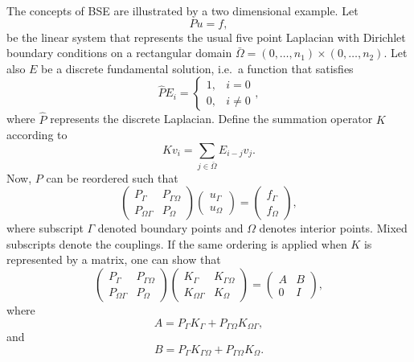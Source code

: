 \documentclass{report}
\begin{document}
The concepts of BSE are illustrated by a two dimensional example. Let
\[
Pu=f,
\]
be the linear system that represents the usual five point Laplacian
with Dirichlet boundary conditions on a rectangular domain
$\bar{\Omega}=(0,\ldots,n_1)\times(0,\ldots,n_2)$. Let also $E$ be a
discrete fundamental solution, i.e.~a function that satisfies
\[
\hat{P}E_i = \left\{ \begin{array}{ll}
1, & i=0\\
0, & i\ne 0 \end{array} \right. ,
\]
where $\hat{P}$ represents the discrete Laplacian. Define the
summation operator $K$ according to
\[
Kv_i = \sum_{j\in\bar{\Omega}}E_{i-j}v_j.
\]
Now, $P$ can be reordered such that
\begin{equation}
\label{eq:Puf}
\left( \begin{array}{cc} P_{\Gamma} & P_{\Gamma\Omega}\\
P_{\Omega\Gamma} & P_{\Omega} \end{array} \right)
\left( \begin{array}{c} u_{\Gamma}\\ u_{\Omega} \end{array} \right)
=\left( \begin{array}{c} f_{\Gamma}\\ f_{\Omega} \end{array} \right),
\end{equation}
where subscript $\Gamma$ denoted boundary points and $\Omega$ denotes
interior points. Mixed subscripts denote the couplings. If the same
ordering is applied when $K$ is represented by a matrix, one can show
that
\begin{equation}
\label{eq:KP}
\left( \begin{array}{cc} P_{\Gamma} & P_{\Gamma\Omega}\\
P_{\Omega\Gamma} & P_{\Omega} \end{array} \right)
\left( \begin{array}{cc} K_{\Gamma} & K_{\Gamma\Omega}\\
K_{\Omega\Gamma} & K_{\Omega} \end{array} \right)
=\left( \begin{array}{cc} A & B\\
0 & I \end{array} \right),
\end{equation}
where
\[
A = P_{\Gamma}K_{\Gamma} + P_{\Gamma\Omega}K_{\Omega\Gamma},
\]
and
\[
B = P_{\Gamma}K_{\Gamma\Omega}+P_{\Gamma\Omega}K_{\Omega}.
\]
\end{document}
